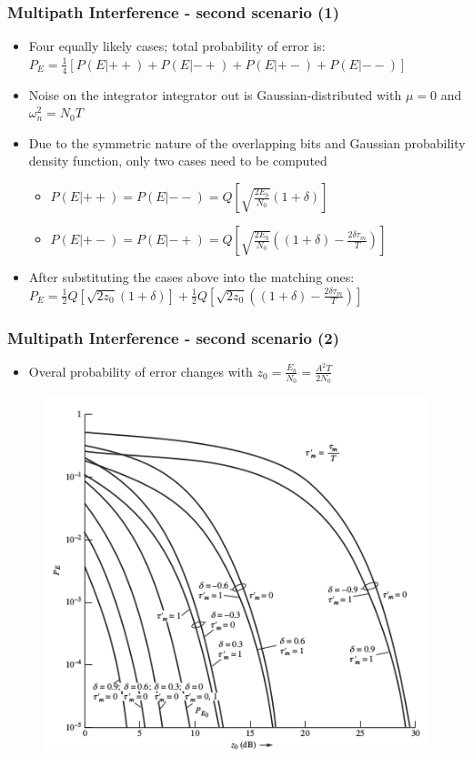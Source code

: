 \documentclass{beamer}
\begin{document}
\begin{frame}
	\frametitle{Multipath Interference - second scenario (1)}
	\begin{itemize}
		\item Four equally likely cases; total probability of error is: $ P_E = \frac{1}{4}[P(E|++) + P(E|-+) + P(E|+-) + P(E|--)] $
		\item Noise on the integrator integrator out is Gaussian-distributed with $ \mu = 0 $ and $ \omega^2_n = N_0T $
		\item Due to the symmetric nature of the overlapping bits and Gaussian probability density function, only two cases need to be computed
		\begin{itemize}
			\item $ P(E|++) = P(E|--) = Q\left[\sqrt{\frac{2E_b}{N_0}}(1+\delta)\right] $
			\item $ P(E|+-) = P(E|-+) = Q\left[\sqrt{\frac{2E_b}{N_0}}\left((1+\delta) - \frac{2\delta\tau_m}{T}\right)\right] $
		\end{itemize}
		\item After substituting the cases above into the matching ones: $ P_E = \frac{1}{2}Q\left[\sqrt{2z_0}(1+\delta)\right] + \frac{1}{2}Q\left[\sqrt{2z_0}\left((1+\delta) - \frac{2\delta\tau_m}{T}\right)\right] $
	\end{itemize}
\end{frame}

\begin{frame}
	\frametitle{Multipath Interference - second scenario (2)}
	\begin{itemize}
		\item Overal probability of error changes with $ z_0 = \frac{E_b}{N_0} = \frac{A^2T}{2N_0} $
	\end{itemize}
	\begin{figure}
		\includegraphics[width=\textwidth, height=0.7\textheight, keepaspectratio]{pe_vs_z0.png}
	\end{figure}
\end{frame}
\end{document}
